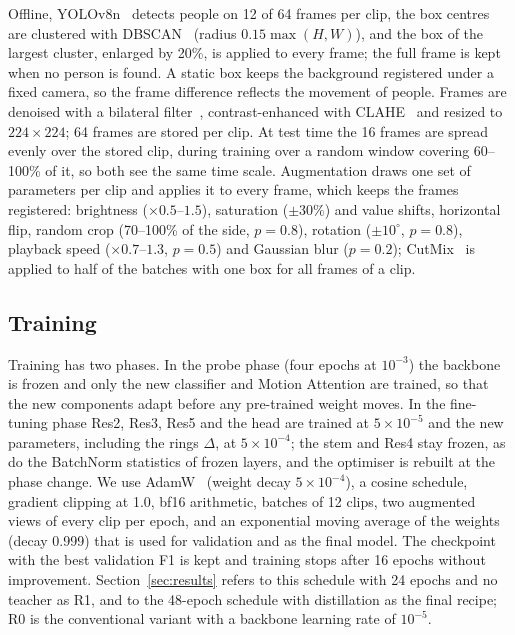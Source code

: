 \documentclass[conference]{IEEEtran}
\begin{document}
Offline, YOLOv8n~\cite{yolov8} detects people on 12 of 64 frames per clip,
the box centres are clustered with DBSCAN~\cite{dbscan} (radius
$0.15\max(H,W)$), and the box of the largest cluster, enlarged by 20\%, is
applied to every frame; the full frame is kept when no person is found. A
static box keeps the background registered under a fixed camera, so the
frame difference reflects the movement of people. Frames are denoised with
a bilateral filter~\cite{bilateral}, contrast-enhanced with
CLAHE~\cite{clahe} and resized to $224\times224$; 64 frames are stored per
clip. At test time the 16 frames are spread evenly over the stored clip,
during training over a random window covering 60--100\% of it, so both see
the same time scale. Augmentation draws one set of parameters per clip and
applies it to every frame, which keeps the frames registered: brightness
($\times0.5$--$1.5$), saturation ($\pm30\%$) and value shifts, horizontal
flip, random crop (70--100\% of the side, $p=0.8$), rotation
($\pm10^\circ$, $p=0.8$), playback speed ($\times0.7$--$1.3$, $p=0.5$) and
Gaussian blur ($p=0.2$); CutMix~\cite{cutmix} is applied to half of the
batches with one box for all frames of a clip.

\subsection{Training}
\label{sec:training}

Training has two phases. In the probe phase (four epochs at $10^{-3}$) the
backbone is frozen and only the new classifier and Motion Attention are
trained, so that the new components adapt before any pre-trained weight
moves. In the fine-tuning phase Res2, Res3, Res5 and the head are trained
at $5\times10^{-5}$ and the new parameters, including the rings $\Delta$,
at $5\times10^{-4}$; the stem and Res4 stay frozen, as do the BatchNorm
statistics of frozen layers, and the optimiser is rebuilt at the phase
change. We use AdamW~\cite{adamw} (weight decay $5\times10^{-4}$), a cosine
schedule, gradient clipping at 1.0, bf16 arithmetic, batches of 12 clips,
two augmented views of every clip per epoch, and an exponential moving
average of the weights (decay 0.999) that is used for validation and as the
final model. The checkpoint with the best validation F1 is kept and
training stops after 16 epochs without improvement. Section~\ref{sec:results}
refers to this schedule with 24 epochs and no teacher as R1, and to the
48-epoch schedule with distillation as the final recipe; R0 is the
conventional variant with a backbone learning rate of $10^{-5}$.
\end{document}
